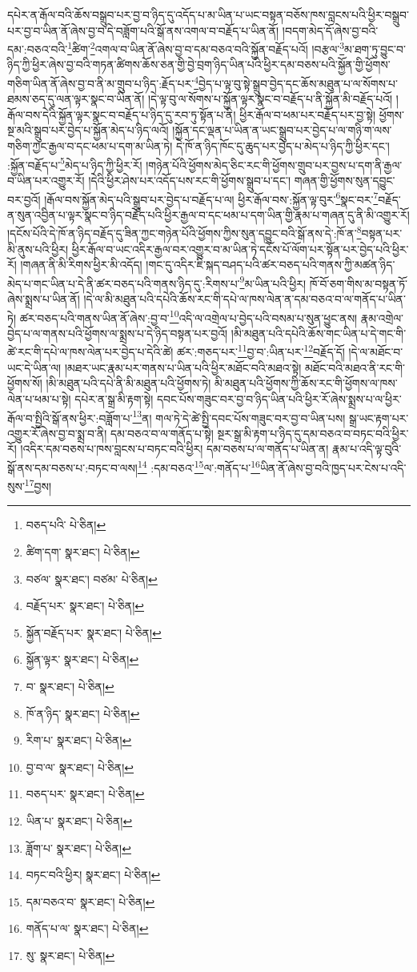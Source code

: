 དཔེར་ན་རྒོལ་བའི་ཆོས་བསྒྲུབ་པར་བྱ་བ་ཉིད་དུ་འདོད་པ་མ་ཡིན་པ་ཡང་བསྟན་བཅོས་ཁས་བླངས་པའི་ཕྱིར་བསྒྲུབ་པར་བྱ་བ་ཡིན་ནོ་ཞེས་བྱ་བ་དེ་བཟློག་པའི་སྒོ་ནས་འགལ་བ་བརྗོད་པ་ཡིན་ནོ། །བདག་མེད་དོ་ཞེས་བྱ་བའི་དམ་:བཅའ་བའི་\footnote{བཅད་པའི་  པེ་ཅིན། }ཚིག་\footnote{ཚིག་དག་  སྣར་ཐང་།  པེ་ཅིན། }འགལ་བ་ཡིན་ནོ་ཞེས་བྱ་བ་དམ་བཅའ་བའི་སྐྱོན་བརྗོད་པའོ། །བརྩལ་\footnote{བཙལ་  སྣར་ཐང་། བཙམ་  པེ་ཅིན། }མ་ཐག་ཏུ་བྱུང་བ་ཉིད་ཀྱི་ཕྱིར་ཞེས་བྱ་བའི་གཏན་ཚིགས་ཆོས་ཅན་གྱི་བྱེ་བྲག་ཉིད་ཡིན་པའི་ཕྱིར་དམ་བཅས་པའི་སྐྱོན་གྱི་ཕྱོགས་གཅིག་ཡིན་ནོ་ཞེས་བྱ་བ་ནི་མ་གྲུབ་པ་ཉིད་:རྗོད་པར་\footnote{བརྗོད་པར་  སྣར་ཐང་།  པེ་ཅིན། }བྱེད་པ་ལྟ་བུ་སྟེ་སྒྲུབ་བྱེད་དང་ཆོས་མཐུན་པ་ལ་སོགས་པ་ཐམས་ཅད་དུ་ལན་ལྟར་སྣང་བ་ཡིན་ནོ། །དེ་ལྟ་བུ་ལ་སོགས་པ་སྐྱོན་ལྟར་སྣང་བ་བརྗོད་པ་ནི་སྐྱོན་མི་བརྗོད་པའོ། །རྒོལ་བས་དེའི་སྐྱོན་ལྟར་སྣང་བ་བརྗོད་པ་ཉིད་དུ་རབ་ཏུ་སྟོན་པ་ནི། ཕྱིར་རྒོལ་བ་ཕམ་པར་བརྗོད་པར་བྱ་སྟེ། ཕྱོགས་སྔ་མའི་སྒྲུབ་པར་བྱེད་པ་སྐྱོན་མེད་པ་ཉིད་ལའོ། །སྐྱོན་དང་ལྡན་པ་ཡིན་ན་ཡང་སྒྲུབ་པར་བྱེད་པ་ལ་གཉི་ག་ལས་གཅིག་ཀྱང་རྒྱལ་བ་དང་ཕམ་པ་དག་མ་ཡིན་ཏེ། དེ་ཁོ་ན་ཉིད་ཁོང་དུ་ཆུད་པར་བྱེད་པ་མེད་པ་ཉིད་ཀྱི་ཕྱིར་དང་། :སྐྱོན་བརྗོད་པ་\footnote{སྐྱོན་བརྗོད་པར་  སྣར་ཐང་།  པེ་ཅིན། }མེད་པ་ཉིད་ཀྱི་ཕྱིར་རོ། །གཉེན་པོའི་ཕྱོགས་མེད་ཅིང་རང་གི་ཕྱོགས་གྲུབ་པར་བྱས་པ་དག་ནི་རྒྱལ་བ་ཡིན་པར་འགྱུར་རོ། །དེའི་ཕྱིར་ཤེས་པར་འདོད་པས་རང་གི་ཕྱོགས་སྒྲུབ་པ་དང་། གཞན་གྱི་ཕྱོགས་སུན་དབྱུང་བར་བྱའོ། །རྒོལ་བས་སྐྱོན་མེད་པའི་སྒྲུབ་པར་བྱེད་པ་བརྗོད་པ་ལ། ཕྱིར་རྒོལ་བས་:སྐྱོན་ལྟ་བུར་\footnote{སྐྱོན་ལྟར་  སྣར་ཐང་།  པེ་ཅིན། }སྣང་བར་\footnote{བ་  སྣར་ཐང་།  པེ་ཅིན། }བརྗོད་ན་སུན་འབྱིན་པ་ལྟར་སྣང་བ་ཉིད་བརྗོད་པའི་ཕྱིར་རྒྱལ་བ་དང་ཕམ་པ་དག་ཡིན་གྱི་རྣམ་པ་གཞན་དུ་ནི་མི་འགྱུར་རོ། །དངོས་པོའི་དེ་ཁོ་ན་ཉིད་བརྗོད་དུ་ཟིན་ཀྱང་གཉེན་པོའི་ཕྱོགས་ཀྱིས་སུན་དབྱུང་བའི་སྒོ་ནས་དེ་:ཁོ་ན་\footnote{ཁོ་ན་ཉིད་  སྣར་ཐང་།  པེ་ཅིན། }བསྟན་པར་མི་ནུས་པའི་ཕྱིར། ཕྱིར་རྒོལ་བ་ཡང་འདིར་རྒྱལ་བར་འགྱུར་བ་མ་ཡིན་ཏེ་དངོས་པོ་ལོག་པར་སྟོན་པར་བྱེད་པའི་ཕྱིར་རོ། །གཞན་ནི་མི་རིགས་ཕྱིར་མི་འདོད། །གང་དུ་འདིར་ཇི་སྐད་བཤད་པའི་ཚར་བཅད་པའི་གནས་ཀྱི་མཚན་ཉིད་མེད་པ་གང་ཡིན་པ་དེ་ནི་ཚར་བཅད་པའི་གནས་ཉིད་དུ་:རིགས་པ་\footnote{རིག་པ་  སྣར་ཐང་།  པེ་ཅིན། }མ་ཡིན་པའི་ཕྱིར། ཁོ་བོ་ཅག་གིས་མ་བསྟན་ཏོ་ཞེས་སྨྲས་པ་ཡིན་ནོ། །དེ་ལ་མི་མཐུན་པའི་དཔེའི་ཆོས་རང་གི་དཔེ་ལ་ཁས་ལེན་ན་དམ་བཅའ་བ་ལ་གནོད་པ་ཡིན་ཏེ། ཚར་བཅད་པའི་གནས་ཡིན་ནོ་ཞེས་:བྱ་བ་\footnote{བྱ་བ་ལ་  སྣར་ཐང་།  པེ་ཅིན། }འདི་ལ་འགྲེལ་པ་བྱེད་པའི་བསམ་པ་སུན་ཕྱུང་ནས། རྣམ་འགྲེལ་བྱེད་པ་ལ་གནས་པའི་ཕྱོགས་ལ་སྨྲས་པ་དེ་ཉིད་བསྟན་པར་བྱའོ། །མི་མཐུན་པའི་དཔེའི་ཆོས་གང་ཡིན་པ་དེ་གང་གི་ཚེ་རང་གི་དཔེ་ལ་ཁས་ལེན་པར་བྱེད་པ་དེའི་ཚེ། ཚར་:གཅད་པར་\footnote{བཅད་པར་  སྣར་ཐང་།  པེ་ཅིན། }བྱ་བ་:ཡིན་པར་\footnote{ཡིན་པ་  སྣར་ཐང་།  པེ་ཅིན། }བརྗོད་དོ། །དེ་ལ་མཐོང་བ་ཡང་དེ་ཡིན་ལ། །མཐར་ཡང་རྣམ་པར་གནས་པ་ཡིན་པའི་ཕྱིར་མཐོང་བའི་མཐའ་སྟེ། མཐོང་བའི་མཐའ་ནི་རང་གི་ཕྱོགས་སོ། །མི་མཐུན་པའི་དཔེ་ནི་མི་མཐུན་པའི་ཕྱོགས་ཏེ། མི་མཐུན་པའི་ཕྱོགས་ཀྱི་ཆོས་རང་གི་ཕྱོགས་ལ་ཁས་ལེན་པ་ཕམ་པ་སྟེ། དཔེར་ན་སྒྲ་མི་རྟག་སྟེ། དབང་པོས་གཟུང་བར་བྱ་བ་ཉིད་ཡིན་པའི་ཕྱིར་རོ་ཞེས་སྨྲས་པ་ལ་ཕྱིར་རྒོལ་བ་སྤྱིའི་སྒོ་ནས་ཕྱིར་:བཟློག་པ་\footnote{ཟློག་པ་  སྣར་ཐང་།  པེ་ཅིན། }ན། གལ་ཏེ་དེ་ཚེ་སྤྱི་དབང་པོས་གཟུང་བར་བྱ་བ་ཡིན་པས། སྒྲ་ཡང་རྟག་པར་འགྱུར་རོ་ཞེས་བྱ་བ་སྨྲ་བ་ནི། དམ་བཅའ་བ་ལ་གནོད་པ་སྟེ། སྔར་སྒྲ་མི་རྟག་པ་ཉིད་དུ་དམ་བཅའ་བ་བཏང་བའི་ཕྱིར་རོ། །འདིར་དམ་བཅས་པ་ཁས་བླངས་པ་བཏང་བའི་ཕྱིར། དམ་བཅས་པ་ལ་གནོད་པ་ཡིན་ན། རྣམ་པ་འདི་ལྟ་བུའི་སྒོ་ནས་དམ་བཅས་པ་:བཏང་བ་ལས།\footnote{བཏང་བའི་ཕྱིར།  སྣར་ཐང་།  པེ་ཅིན། } :དམ་བཅའ་\footnote{དམ་བཅའ་བ་  སྣར་ཐང་།  པེ་ཅིན། }ལ་:གནོད་པ་\footnote{གནོད་པ་ལ་  སྣར་ཐང་།  པེ་ཅིན། }ཡིན་ནོ་ཞེས་བྱ་བའི་ཁྱད་པར་ངེས་པ་འདི་སུས་\footnote{སུ་  སྣར་ཐང་།  པེ་ཅིན། }བྱས། 